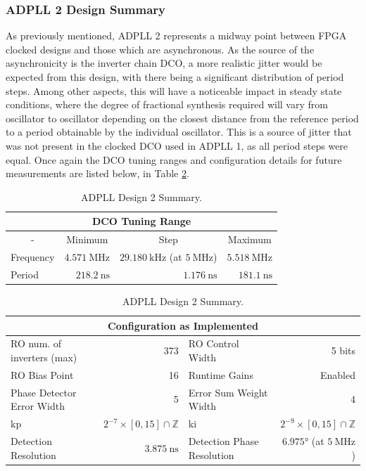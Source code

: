 \subsubsection{\acs{ADPLL} 2 Design Summary}
As previously mentioned, \ac{ADPLL} 2 represents a midway point between \ac{FPGA} clocked designs and those which are asynchronous. As the source of the asynchronicity is the inverter chain \ac{DCO}, a more realistic jitter would be expected from this design, with there being a significant distribution of period steps. Among other aspects, this will have a noticeable impact in steady state conditions, where the degree of fractional synthesis required will vary from oscillator to oscillator depending on the closest distance from the reference period to a period obtainable by the individual oscillator. This is a source of jitter that was not present in the clocked \ac{DCO} used in \ac{ADPLL} 1, as all period steps were equal. Once again the \ac{DCO} tuning ranges and configuration details for future measurements are listed below, in Table \ref{table:adpll2}.

\begin{table}[!h]%
	\begin{center}
		\begin{tabular}{|l|r|r|r|}
			\multicolumn{4}{c}{\ac{DCO} Tuning Range} \T\\
			\hline
			\multicolumn{1}{|c|}{-} & \multicolumn{1}{c|}{Minimum} & \multicolumn{1}{c|}{Step} & \multicolumn{1}{c|}{Maximum} \T\\
			\hline
			Frequency & $4.571~\si{\mega\hertz}$ & $29.180~\si{\kilo\hertz}$ (at $5~\si{\mega\hertz}$) & $5.518~\si{\mega\hertz}$ \T\\
			\hline
			Period & $218.2~\si{\nano\second}$ & $1.176~\si{\nano\second}$ & $181.1~\si{\nano\second}$ \T\\
			\hline
		\end{tabular}
		\begin{tabular}{|l|r|l|r|}
			\multicolumn{4}{c}{Configuration as Implemented} \T\\
			\hline
			\ac{RO} num. of inverters (max) & 373 & \ac{RO} Control Width & 5 bits \T\\
			\hline
			\ac{RO} Bias Point & 16 & Runtime Gains & Enabled \T\\
			\hline
			Phase Detector Error Width & 5 & Error Sum Weight Width & 4 \T\\
			\hline
			\acs{kp} & $2^{-7}\times[0,15]\cap\mathbb{Z}$ & \acs{ki} & $2^{-9}\times[0,15]\cap\mathbb{Z}$ \T\\
			\hline
			Detection Resolution & $3.875~\si{\nano\second}$ & Detection Phase Resolution & $6.975\si{\degree}$ (at $5~\si{\mega\hertz}$)\\
			\hline
		\end{tabular}
	\end{center}
	\caption[\ac{ADPLL} Design 2 Summary]{\ac{ADPLL} Design 2 Summary.}
	\label{table:adpll2}
\end{table}


